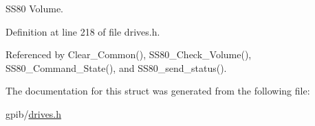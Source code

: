 S\+S80 Volume. 



Definition at line 218 of file drives.\+h.



Referenced by Clear\+\_\+\+Common(), S\+S80\+\_\+\+Check\+\_\+\+Volume(), S\+S80\+\_\+\+Command\+\_\+\+State(), and S\+S80\+\_\+send\+\_\+status().



The documentation for this struct was generated from the following file\+:\begin{DoxyCompactItemize}
\item 
gpib/\hyperlink{drives_8h}{drives.\+h}\end{DoxyCompactItemize}
